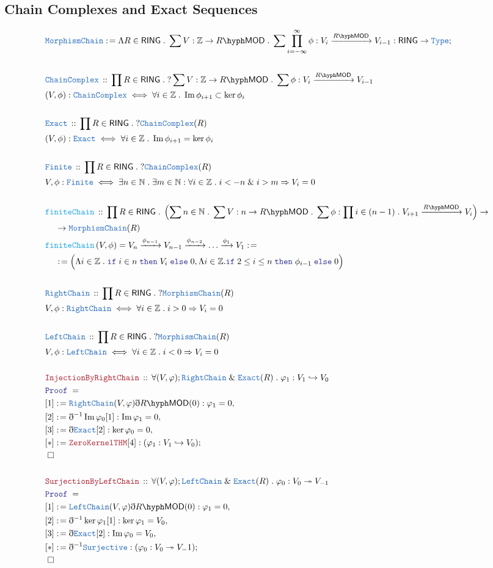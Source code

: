 \documentclass[12pt]{scrartcl}
\newcommand{\TYPE}[1]{\textcolor{NavyBlue}{\mathtt{#1}}}
\newcommand{\FUNC}[1]{\textcolor{Cerulean}{\mathtt{#1}}}
\newcommand{\LOGIC}[1]{\textcolor{Blue}{\mathtt{#1}}}
\newcommand{\THM}[1]{\textcolor{Maroon}{\mathtt{#1}}}
\renewcommand{\.}{\; . \;}
\newcommand{\de}{: \kern 0.1pc =}
\newcommand{\If}{\LOGIC{if} \;}
\newcommand{\Then}{ \; \LOGIC{then} \;}
\newcommand{\Else}{\; \LOGIC{else} \;}
\newcommand{\Act}[1]{\left(#1\right)}
\newcommand{\Theorem}[2]{& \THM{#1} \, :: \, #2 \\ & \Proof = \\ }
\newcommand{\DeclareType}[2]{& \TYPE{#1} \, :: \, #2 \\}
\newcommand{\DefineType}[3]{& #1 : \TYPE{#2} \iff #3 \\}
\newcommand{\DeclareFunc}[2]{& \FUNC{#1} \, :: \, #2 \\}
\newcommand{\DefineNamedFunc}[4]{&  \FUNC{#1}\Act{#2} = #3 \de #4 \\}
\newcommand{\NewLine}{\\ & \kern 1pc}
\newcommand{\Page}[1]{ \begin{align*} #1 \end{align*}   }
\newcommand{ \bd }{ \ByDef }
\renewcommand{\And}{\; \& \;}
\newcommand{\Type}{\TYPE{Type}}
\newcommand{\Int}{\mathbb{Z} }
\newcommand{\Nat}{\mathbb{N} }
\DeclareMathOperator*{\im}{Im}
\newcommand{\ToInj}{\hookrightarrow}
\newcommand{\ToSurj}{\twoheadrightarrow}
\newcommand{\Say}[3]{& #1 \de #2 : #3, \\}
\newcommand{\Conclude}[3]{& #1 \de #2 : #3; \\}
\newcommand{\QED}{\; \square}
\newcommand{\EndProof}{& \QED \\}
\newcommand{\ByDef}{\eth}
\newcommand{\Proof}{\LOGIC{Proof} \; }
\newcommand{\Arrow}[1]{\xrightarrow{#1}}
\newcommand{\LMOD}[1]{#1\hyph\mathsf{MOD}}
\newcommand{\RING}{\mathsf{RING}}
\begin{document}
\subsection{Chain Complexes and Exact Sequences}
\Page{
	\Conclude{\TYPE{MorphismChain}}{ \Lambda R \in \RING \. \sum V : \Int \to \LMOD{R}  \. \sum \prod^\infty_{i=-\infty} \phi : V_{i} \Arrow{\LMOD{R}} V_{i-1}}{\RING \to \Type}
	\\
	\DeclareType{ChainComplex}{\prod R \in \RING \. ?\sum V : \Int \to \LMOD{R}  \. \sum \phi : V_{i} \Arrow{\LMOD{R}} V_{i-1}  }
	\DefineType{(V,\phi)}{ChainComplex}{ \forall i \in \Int \. \im  \phi_{i+1} \subset \ker \phi_i  }
	\\
	\DeclareType{Exact}{\prod R \in \RING \. ?\TYPE{ChainComplex}(R)  }
	\DefineType{(V,\phi)}{Exact}{ \forall i \in \Int \. \im  \phi_{i+1} = \ker \phi_i  }
	\\
	\DeclareType{Finite}{\prod R \in \RING \. ?\TYPE{ChainComplex}(R)  }
	\DefineType{V,\phi}{Finite}{ \exists n \in \Nat \. \exists m \in \Nat : \forall i \in \Int \. i < -n \And i > m \Rightarrow V_i = 0}
	\\
	\DeclareFunc{finiteChain}{
		\prod R \in \RING \. 
		\left( \sum n \in \Nat \. \sum V : n \to \LMOD{R} \. \sum 
			\phi : \prod i \in (n-1) \. V_{i+1} \Arrow{\LMOD{R}} V_{i}
		\right) \to \NewLine \to \TYPE{MorphismChain}(R) }
	\DefineNamedFunc{finiteChain}{V,\phi}{V_n \Arrow{\phi_{n-1}} V_{n-1} \Arrow{\phi_{n-2}} \ldots \Arrow{\phi_1} V_1 }
		{ 
			\NewLine \de
			\Big(\Lambda i \in \Int \. \If i \in n \Then V_i \Else 0, \Lambda i \in \Int . 
			\If 2 \le i \le n \Then \phi_{i-1} \Else 0 \Big)  
		}
	\\
	\DeclareType{RightChain}{\prod R \in \RING \. ?\TYPE{MorphismChain}(R)  }
	\DefineType{V,\phi}{RightChain}{  \forall i \in \Int \. i > 0 \Rightarrow V_i = 0}
	\\
	\DeclareType{LeftChain}{\prod R \in \RING \. ?\TYPE{MorphismChain}(R)  }
	\DefineType{V,\phi}{LeftChain}{  \forall i \in \Int \. i < 0 \Rightarrow V_i = 0}
	\\
	\Theorem{InjectionByRightChain}{\forall (V,\varphi) ; \TYPE{RightChain} \And \TYPE{Exact}(R) \. \varphi_1 : V_1 \ToInj V_0   }
	\Say{[1]}{\TYPE{RightChain}(V,\varphi)\bd \LMOD{R}(0)}{\varphi_1 = 0}
	\Say{[2]}{\bd^{-1}\im \varphi_0[1]}{\im \varphi_1=0}
	\Say{[3]}{\bd \TYPE{Exact}[2]}{ \ker \varphi_0 = 0   }
	\Conclude{[*]}{\THM{ZeroKernelTHM}[4]}{(\varphi_1 : V_1 \ToInj V_0)}
	\EndProof
	\\
	\Theorem{SurjectionByLeftChain}{\forall (V,\varphi) ; \TYPE{LeftChain} \And \TYPE{Exact}(R) \. \varphi_0 : V_{0} \ToSurj V_{-1}   }
	\Say{[1]}{\TYPE{LeftChain}(V,\varphi)\bd \LMOD{R}(0)}{\varphi_1 = 0}
	\Say{[2]}{\bd^{-1}\ker \varphi_1[1]}{\ker \varphi_1 = V_0}
	\Say{[3]}{\bd \TYPE{Exact}[2]}{ \im \varphi_0 = V_0   }
	\Conclude{[*]}{\bd^{-1} \TYPE{Surjective}}{(\varphi_0 : V_{0} \ToSurj V_-1)}
	\EndProof
}
\end{document}

